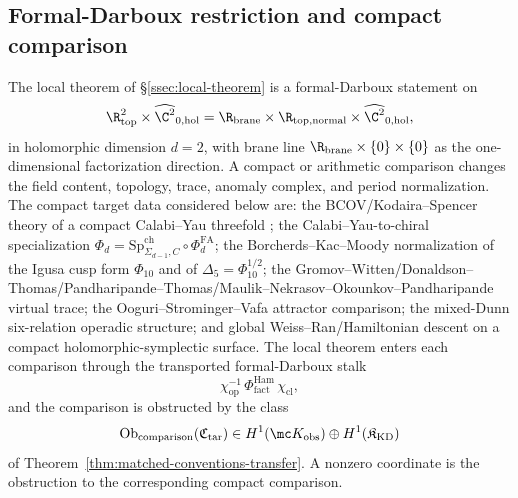 \subsection{Formal-Darboux restriction and compact comparison}\label{ssec:cross-target-restriction}\label{app:comparison-conventions}

The local theorem of \S\ref{ssec:local-theorem} is a formal-Darboux
statement on
\[
  \R^2_{\mathrm{top}}\times\widehat{\C^2}_{0,\mathrm{hol}}
  =
  \R_{\mathrm{brane}}\times\R_{\mathrm{top,normal}}
  \times\widehat{\C^2}_{0,\mathrm{hol}},
\]
in holomorphic dimension \(d=2\), with brane line
\(\R_{\mathrm{brane}}\times\{0\}\times\{0\}\) as the one-dimensional
factorization direction.  A compact or arithmetic comparison changes
the field content, topology, trace, anomaly complex, and period
normalization.  The compact target data considered below are: the
BCOV/Kodaira--Spencer theory of a compact Calabi--Yau threefold
\cite{bcov}; the Calabi--Yau-to-chiral specialization
\(\Phi_d=\mathrm{Sp}^{\mathrm{ch}}_{\Sigma_{d-1},C}\circ
\Phi^{\mathrm{FA}}_d\); the Borcherds--Kac--Moody normalization of the
Igusa cusp form \(\Phi_{10}\) and of
\(\Delta_5=\Phi_{10}^{1/2}\); the
Gromov--Witten/Donaldson--Thomas/Pandharipande--Thomas/Maulik--Nekrasov--Okounkov--Pandharipande
virtual trace; the Ooguri--Strominger--Vafa attractor comparison; the
mixed-Dunn six-relation operadic structure; and global
Weiss--Ran/Hamiltonian descent on a compact holomorphic-symplectic
surface.  The local theorem enters each comparison through the
transported formal-Darboux stalk
\[
  \chi_{\mathrm{op}}^{-1}\,
  \Phi^{\mathrm{Ham}}_{\mathrm{fact}}\,
  \chi_{\mathrm{cl}},
\]
and the comparison is obstructed by the class
\[
  \operatorname{Ob}_{\mathrm{comparison}}(\mathfrak C_{\mathrm{tar}})
  \in
  H^1(\mc K_{\mathrm{obs}})\oplus H^1(\mathfrak K_{\mathrm{KD}})
\]
of Theorem~\ref{thm:matched-conventions-transfer}.  A nonzero
coordinate is the obstruction to the corresponding compact comparison.

